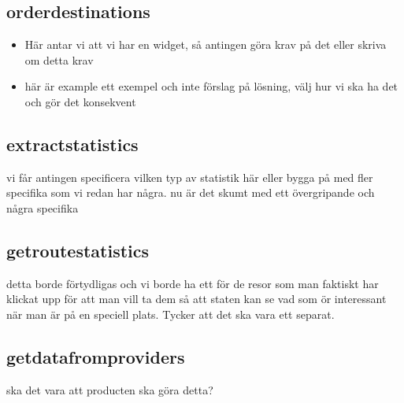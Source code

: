 \documentclass[a4paper]{article}
\begin{document}
		
	\subsection{orderdestinations}
		\begin{itemize}
			\item Här antar vi att vi har en widget, så antingen göra krav på det eller skriva om detta krav
			\item här är example ett exempel och inte förslag på lösning, välj hur vi ska ha det och gör det konsekvent
 		
		\end{itemize}
		
	\subsection{extractstatistics}
vi får antingen specificera vilken typ av statistik  här eller bygga på med  fler specifika som vi redan har några. nu är det skumt med ett övergripande och några specifika
		
	\subsection{getroutestatistics}
	detta borde förtydligas och vi borde ha ett för de resor som man faktiskt har klickat upp för att man vill ta dem så att staten kan se vad som ör interessant när man är på en speciell plats. Tycker att det ska vara ett separat.
	
	\subsection{getdatafromproviders}
	ska det vara att producten ska göra detta?
	
\end{document}
